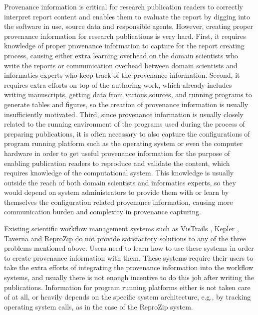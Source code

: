  
 
Provenance information is critical for research publication readers to correctly interpret report content and enables them to evaluate the report by digging into the software in use, source data and responsible agents. However, creating proper provenance information for research publications is very hard. First, it requires knowledge of proper provenance information to capture for the report creating process, causing either extra learning overhead on the domain scientists who write the reports or communication overhead between domain scientists and informatics experts who keep track of the provenance information. Second, it requires extra efforts on top of the authoring work, which already includes writing manuscripts, getting data from various sources, and running programs to generate tables and figures, so the creation of provenance information is usually insufficiently motivated. Third, since provenance information is usually closely related to the running environment of the programs used during the process of preparing publications, it is often necessary to also capture the configurations of program running platform such as the operating system or even the computer hardware in order to get useful provenance information for the purpose of enabling publication readers to reproduce and validate the content, which requires knowledge of the computational system. This knowledge is usually outside the reach of both domain scientists and informatics experts, so they would depend on system administrators to provide them with or learn by themselves the configuration related provenance information, causing more communication burden and complexity in provenance capturing.

Existing scientific workflow management systems such as VisTrails \cite{freire2014reproducibility}, Kepler \cite{ludascher2006scientific}, Taverna \cite{wolstencroft2013taverna} and ReproZip \cite{chirigati2013reprozip} do not provide satisfactory solutions to any of the three problems mentioned above. Users need to learn how to use these systems in order to create provenance information with them. These systems require their users to take the extra efforts of integrating the provenance information into the workflow systems, and usually there is not enough incentive to do this job after writing the publications. Information for program running platforms either is not taken care of at all, or heavily depends on the specific system architecture, e.g., by tracking operating system calls, as in the case of the ReproZip system. 

